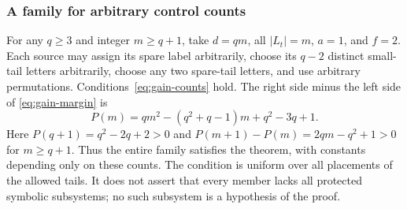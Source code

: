 \documentclass[11pt,reqno]{amsart}
\numberwithin{equation}{section}
\theoremstyle{definition}
\begin{document}
\subsubsection{A family for arbitrary control counts}
For any $q\ge3$ and integer $m\ge q+1$, take $d=qm$,
all $|L_t|=m$, $a=1$, and $f=2$. Each source may assign
its spare label arbitrarily, choose its $q-2$ distinct small-tail
letters arbitrarily, choose any two spare-tail letters, and use
arbitrary permutations. Conditions~\eqref{eq:gain-counts} hold.
The right side minus the left side of \eqref{eq:gain-margin} is
\[
 P(m)=qm^2-(q^2+q-1)m+q^2-3q+1.
\]
Here $P(q+1)=q^2-2q+2>0$ and
$P(m+1)-P(m)=2qm-q^2+1>0$ for $m\ge q+1$.
Thus the entire family satisfies the theorem, with constants
depending only on these counts. The condition is uniform over all placements of the allowed tails.
It does not assert that every member lacks all protected symbolic
subsystems; no such subsystem is a hypothesis of the proof.
\end{document}
